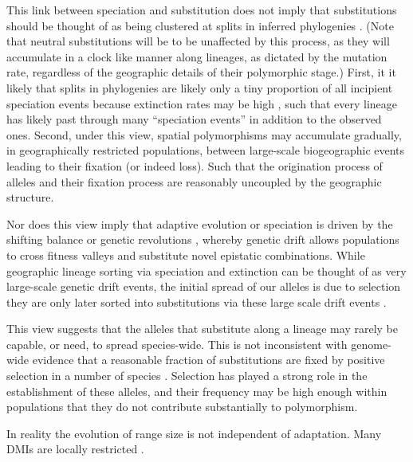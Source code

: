 \documentclass{article}
\begin{document}
This link between speciation and substitution does not imply that
substitutions should be thought of as being clustered at splits in
inferred phylogenies \citep[see ][for a recent exhange on
this]{Pennell:14,Venditti:14,Pennell:14B}. 
(Note that neutral substitutions will be to be unaffected by this process, as they
will accumulate in a clock like manner along lineages, as dictated by
the mutation rate, regardless of the geographic details of their
polymorphic stage.)
First, it it likely that splits in
phylogenies are likely only a tiny proportion of all incipient
speciation events because extinction rates may be high
\citep{Rosenblum:12}, such that every lineage has likely past through
many ``speciation events'' in addition to the observed ones.
Second, under this view, spatial polymorphisms may accumulate gradually, in
geographically restricted populations, between large-scale 
biogeographic events leading to their fixation (or indeed loss). 
Such that the origination process of alleles and their fixation process
are reasonably uncoupled \citep[in the sense of ][]{Gillespie:94} by the geographic structure.

 
Nor does this view imply that adaptive evolution or speciation is driven by the
shifting balance or genetic revolutions \citep{Wright:32,
  Mayr-genetic-revol:1954}, whereby genetic drift allows
populations to cross fitness valleys and substitute novel epistatic
combinations. While geographic lineage sorting via speciation and
extinction can be thought of as very large-scale genetic drift events,
the initial spread of our alleles is due to selection they are only later sorted 
into substitutions via these large scale drift events \citep[see also
][for discussion]{Futuyma:89}. 

This view suggests that the alleles that substitute along a lineage
may rarely be capable, or need, to spread species-wide. This is not
inconsistent with genome-wide evidence that a reasonable fraction of 
substitutions are fixed by positive selection in a number of species
\citep[most notably Drosophila][]{}. Selection has played a strong
role in the establishment of these alleles, and their frequency may be
high enough within populations that they do not contribute
substantially to polymorphism.

In reality the evolution of range size is not independent of
adaptation. Many DMIs are locally restricted \citep{Cutter:12}.
\end{document}
